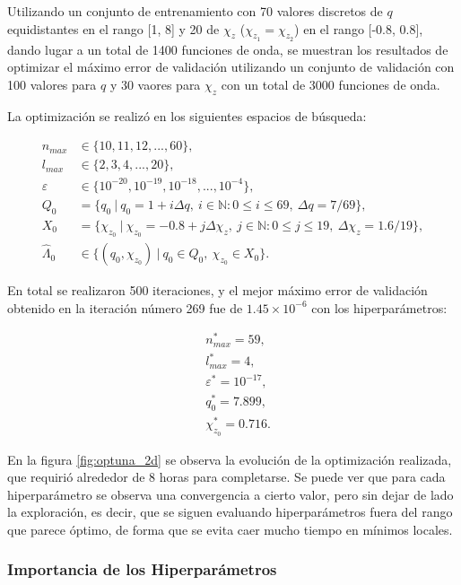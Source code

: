 Utilizando un conjunto de entrenamiento con 70 valores discretos de $q$ equidistantes en el rango [1, 8] y 20 de $\chi_z$ ($\chi_{z_1} = \chi_{z_2}$) en el rango [-0.8, 0.8], dando lugar a un total de 1400 funciones de onda, se muestran los resultados de optimizar el máximo error de validación utilizando un conjunto de validación con 100 valores para $q$ y 30 vaores para $\chi_z$ con un total de 3000 funciones de onda.

La optimización se realizó en los siguientes espacios de búsqueda:
 
\begin{align*}
n_{max} &\in \{10, 11, 12, ..., 60\},\\
l_{max} &\in \{2, 3, 4, ..., 20 \},\\
\varepsilon &\in \{ 10^{-20}, 10^{-19}, 10^{-18}, ..., 10^{-4}\},\\
Q_0 &= \{ q_0 \ | \ q_0 = 1 + i \Delta q, \ i\in \mathbb{N} : 0 \le i \le 69, \ \Delta q = 7/69 \},\\
X_0 &= \{\chi_{z_0} \ | \ \chi_{z_0} = -0.8 + j \Delta \chi_z, \ j\in \mathbb{N} : 0 \le j \le 19, \ \Delta \chi_z = 1.6/19 \}, \\
\hat{\Lambda}_0 &\in \{ (q_0, \chi_{z_0}) \ | \ q_0 \in Q_0,\ \chi_{z_0} \in X_0 \}.
\end{align*}


En total se realizaron 500 iteraciones, y el mejor máximo error de validación obtenido en la iteración número 269 fue de $1{.}45\times 10^{-6}$ con los hiperparámetros:

\begin{align*}
&n_{max}^* = 59, \\
 &l_{max}^* = 4, \\
&\varepsilon^* = 10^{-17},\\
 &q_0^* = 7.899, \\
 &\chi_{z_0}^* = 0.716.
\end{align*}

En la figura \ref{fig:optuna_2d} se observa la evolución de la optimización realizada, que requirió alrededor de 8 horas para completarse. Se puede ver que para cada hiperparámetro se observa una convergencia a cierto valor, pero sin dejar de lado la exploración, es decir, que se siguen evaluando hiperparámetros fuera del rango que parece óptimo, de forma que se evita caer mucho tiempo en mínimos locales.


\subsubsection{Importancia de los Hiperparámetros}

